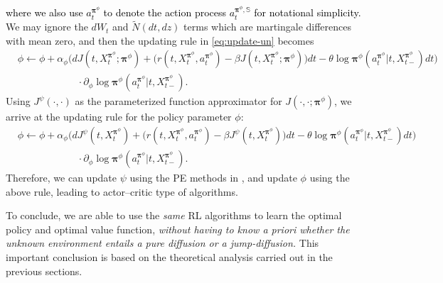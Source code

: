 \documentclass[11pt]{article}
\newcommand{\1}{\mathbbm{1}}
\newcommand{\rev}[1]{\textcolor{black}{{#1}}} %
\begin{document}
\rev{where we also use $a_t^{ \boldsymbol{\pi}^{\phi}}$ to denote the action process $a_t^{ \boldsymbol{\pi}^{\phi}, \mathbb{S}}$ for notational simplicity.}
We may ignore the $dW_t$ and $\widetilde{ N}(dt, dz)$ terms which are martingale differences with mean zero, and then the updating rule in \eqref{eq:update-un} becomes
\begin{align}
&\phi \leftarrow \phi  +  \alpha_{\phi} \Big(dJ(t, X_t^{ \boldsymbol{\pi}^{\phi} }; \boldsymbol{\pi}^{\phi}) + \big(r(t, X_t^{ \boldsymbol{\pi}^{\phi} }, a_t^{ \boldsymbol{\pi}^{\phi} }) -\beta  J(t, X_t^{ \boldsymbol{\pi}^{\phi} }; \boldsymbol{\pi}^{\phi})\big)dt -\theta \log \boldsymbol{\pi}^{\phi}( a_t^{ \boldsymbol{\pi}^{\phi}}|t, X_{t-}^{ \boldsymbol{\pi}^{\phi} })dt \Big)\\
& \qquad \qquad \qquad \cdot \partial_{\phi}\log \boldsymbol{\pi}^{\phi}( a_t^{ \boldsymbol{\pi}^{\phi} }|t, X_{t-}^{ \boldsymbol{\pi}^{\phi} }).
\end{align}
Using $J^{\psi}(\cdot, \cdot)$ as the parameterized function approximator for $J(\cdot, \cdot ; \boldsymbol{\pi}^{\phi})$, we arrive at the updating rule for the policy parameter $\phi$:
\begin{align}
&\phi \leftarrow \phi  +  \alpha_{\phi}\Big(dJ^{\psi}(t, X_t^{ \boldsymbol{\pi}^{\phi} }) + \big(r(t, X_t^{ \boldsymbol{\pi}^{\phi} }, a_t^{ \boldsymbol{\pi}^{\phi} }) -\beta  J^{\psi}(t, X_t^{ \boldsymbol{\pi}^{\phi} }) \big)dt-\theta\log\boldsymbol{\pi}^{\phi}( a_t^{\boldsymbol{\pi}^{\phi} }|t, X_{t-}^{ \boldsymbol{\pi}^{\phi} })dt\Big) \\
& \qquad \qquad \qquad \cdot \partial_\phi\log \boldsymbol{\pi}^{\phi}( a_t^{ \boldsymbol{\pi}^{\phi} }|t, X_{t-}^{ \boldsymbol{\pi}^{\phi} }). \label{eq:update-un2}
\end{align}
Therefore, we can update $\psi$ using the PE methods in \cite{jia2022policy}, and update $\phi$ using the above rule, leading to actor--critic type of algorithms.

To conclude, we are able to use the {\it same} RL algorithms to learn the optimal
policy and optimal value function, {\it without having to know a priori whether the unknown environment entails a pure diffusion or a jump-diffusion.} This important conclusion is based on the theoretical analysis carried out in the previous sections.
\end{document}
